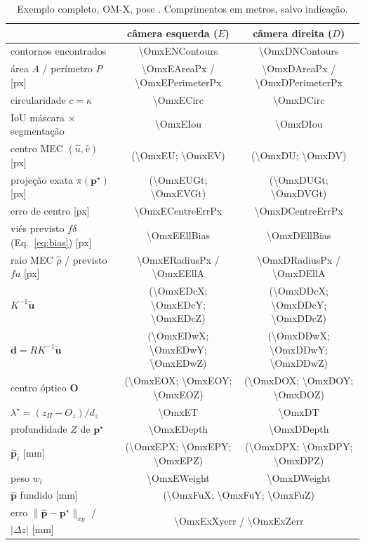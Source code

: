 \documentclass[11pt,a4paper]{article}
\theoremstyle{definition}
\theoremstyle{remark}
\newcommand{\vect}[1]{\bm{#1}}
\newcommand{\code}[1]{\texttt{\detokenize{#1}}}
\begin{document}
\begin{table}[ht]
\centering
\small
\caption{Exemplo completo, OM-X, pose \code{pick_default}. Comprimentos em
metros, salvo indicação.}
\label{tab:exemplo}
\begin{tabular}{@{}lcc@{}}
\toprule
& câmera esquerda ($E$) & câmera direita ($D$)\\
\midrule
contornos encontrados & \num{\OmxENContours} & \num{\OmxDNContours}\\
área $A$ / perímetro $P$ [px] & \num{\OmxEAreaPx} / \num{\OmxEPerimeterPx} & \num{\OmxDAreaPx} / \num{\OmxDPerimeterPx}\\
circularidade $c=\kappa$ & \num{\OmxECirc} & \num{\OmxDCirc}\\
IoU máscara $\times$ segmentação & \num{\OmxEIou} & \num{\OmxDIou}\\
centro MEC $(\hat u,\hat v)$ [px] & (\num{\OmxEU}; \num{\OmxEV}) & (\num{\OmxDU}; \num{\OmxDV})\\
projeção exata $\pi(\vect p^\star)$ [px] & (\num{\OmxEUGt}; \num{\OmxEVGt}) & (\num{\OmxDUGt}; \num{\OmxDVGt})\\
erro de centro [px] & \num{\OmxECentreErrPx} & \num{\OmxDCentreErrPx}\\
viés previsto $f\delta$ (Eq.~\ref{eq:bias}) [px] & \num{\OmxEEllBias} & \num{\OmxDEllBias}\\
raio MEC $\hat\rho$ / previsto $fa$ [px] & \num{\OmxERadiusPx} / \num{\OmxEEllA} & \num{\OmxDRadiusPx} / \num{\OmxDEllA}\\
\midrule
$K^{-1}\tilde{\vect u}$ & (\num{\OmxEDcX}; \num{\OmxEDcY}; \num{\OmxEDcZ}) & (\num{\OmxDDcX}; \num{\OmxDDcY}; \num{\OmxDDcZ})\\
$\vect d=RK^{-1}\tilde{\vect u}$ & (\num{\OmxEDwX}; \num{\OmxEDwY}; \num{\OmxEDwZ}) & (\num{\OmxDDwX}; \num{\OmxDDwY}; \num{\OmxDDwZ})\\
centro óptico $\vect O$ & (\num{\OmxEOX}; \num{\OmxEOY}; \num{\OmxEOZ}) & (\num{\OmxDOX}; \num{\OmxDOY}; \num{\OmxDOZ})\\
$\lambda^\star=(z_\Pi-O_z)/d_z$ & \num{\OmxET} & \num{\OmxDT}\\
profundidade $Z$ de $\vect p^\star$ & \num{\OmxEDepth} & \num{\OmxDDepth}\\
$\hat{\vect p}_i$ [mm] & (\num{\OmxEPX}; \num{\OmxEPY}; \num{\OmxEPZ}) & (\num{\OmxDPX}; \num{\OmxDPY}; \num{\OmxDPZ})\\
peso $w_i$ & \num{\OmxEWeight} & \num{\OmxDWeight}\\
\midrule
$\hat{\vect p}$ fundido [mm] & \multicolumn{2}{c}{(\num{\OmxFuX}; \num{\OmxFuY}; \num{\OmxFuZ})}\\
erro $\|\hat{\vect p}-\vect p^\star\|_{xy}$ / $|\Delta z|$ [mm] & \multicolumn{2}{c}{\num{\OmxExXyerr} / \num{\OmxExZerr}}\\
\bottomrule
\end{tabular}
\end{table}
\end{document}

